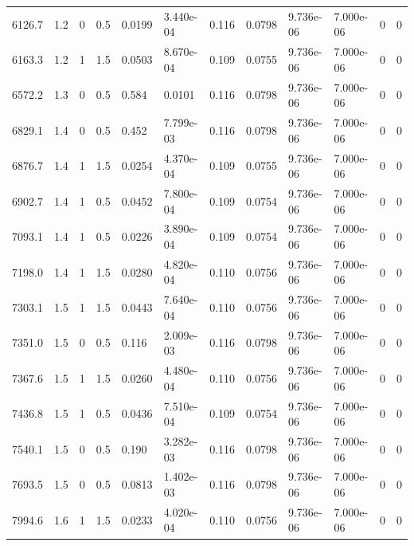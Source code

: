\documentclass[preview]{standalone}
\begin{document}
{{\begin{tabular}{L{1.2cm}C{1.2cm} C{0.3cm}C{0.5cm} C{1.4cm}C{1.4cm} C{1.4cm}C{1.4cm} C{1.6cm}C{1.6cm} C{1.6cm}C{1.6cm}}
  6126.7  &   1.2  & 0     & 0.5 &  0.0199  & 3.440e-04  &  0.116&   0.0798& 9.736e-06 & 7.000e-06   &  0 & 0  \\ 
  6163.3  &   1.2  & 1     & 1.5 &  0.0503  & 8.670e-04  &  0.109&   0.0755& 9.736e-06 & 7.000e-06   &  0 & 0  \\ 
  6572.2  &   1.3  & 0     & 0.5 &  0.584  & 0.0101  &  0.116&   0.0798& 9.736e-06 & 7.000e-06   &  0 & 0  \\ 
  6829.1  &   1.4  & 0     & 0.5 &  0.452  & 7.799e-03  &  0.116&   0.0798& 9.736e-06 & 7.000e-06   &  0 & 0  \\ 
  6876.7  &   1.4  & 1     & 1.5 &  0.0254  & 4.370e-04  &  0.109&   0.0755& 9.736e-06 & 7.000e-06   &  0 & 0  \\ 
  6902.7  &   1.4  & 1     & 0.5 &  0.0452  & 7.800e-04  &  0.109&   0.0754& 9.736e-06 & 7.000e-06   &  0 & 0  \\ 
  7093.1  &   1.4  & 1     & 0.5 &  0.0226  & 3.890e-04  &  0.109&   0.0754& 9.736e-06 & 7.000e-06   &  0 & 0  \\ 
  7198.0  &   1.4  & 1     & 1.5 &  0.0280  & 4.820e-04  &  0.110&   0.0756& 9.736e-06 & 7.000e-06   &  0 & 0  \\ 
  7303.1  &   1.5  & 1     & 1.5 &  0.0443  & 7.640e-04  &  0.110&   0.0756& 9.736e-06 & 7.000e-06   &  0 & 0  \\ 
  7351.0  &   1.5  & 0     & 0.5 &  0.116  & 2.009e-03  &  0.116&   0.0798& 9.736e-06 & 7.000e-06   &  0 & 0  \\ 
  7367.6  &   1.5  & 1     & 1.5 &  0.0260  & 4.480e-04  &  0.110&   0.0756& 9.736e-06 & 7.000e-06   &  0 & 0  \\ 
  7436.8  &   1.5  & 1     & 0.5 &  0.0436  & 7.510e-04  &  0.109&   0.0754& 9.736e-06 & 7.000e-06   &  0 & 0  \\ 
  7540.1  &   1.5  & 0     & 0.5 &  0.190  & 3.282e-03  &  0.116&   0.0798& 9.736e-06 & 7.000e-06   &  0 & 0  \\ 
  7693.5  &   1.5  & 0     & 0.5 &  0.0813  & 1.402e-03  &  0.116&   0.0798& 9.736e-06 & 7.000e-06   &  0 & 0  \\ 
  7994.6  &   1.6  & 1     & 1.5 &  0.0233  & 4.020e-04  &  0.110&   0.0756& 9.736e-06 & 7.000e-06   &  0 & 0  \\ 
\hline 
\end{tabular} 

}}
\end{document}
